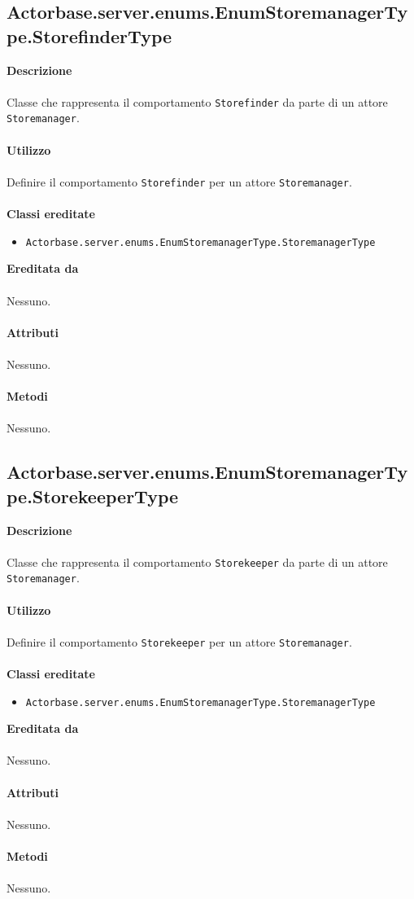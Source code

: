 \documentclass[a4paper]{article}
\begin{document}
			\subsection{Actorbase.server.enums.EnumStoremanagerType.StorefinderType}
		\textbf{Descrizione}
			\\ \\
			Classe che rappresenta il comportamento \texttt{Storefinder} da parte di un attore \texttt{Storemanager}.
			\\ \\
		\textbf{Utilizzo}
			\\ \\
			Definire il comportamento \texttt{Storefinder} per un attore \texttt{Storemanager}.
			\\ \\
		\textbf{Classi ereditate}
			\begin{itemize}
				\item \texttt{Actorbase.server.enums.EnumStoremanagerType.StoremanagerType}
			\end{itemize}
		\textbf{Ereditata da}
		\\ \\
		Nessuno.
		\\ \\
		\textbf{Attributi}
		\\ \\
			Nessuno.
		\\ \\
		\textbf{Metodi}
			\\ \\
			Nessuno.
			
			\subsection{Actorbase.server.enums.EnumStoremanagerType.StorekeeperType}
		\textbf{Descrizione}
			\\ \\
			Classe che rappresenta il comportamento \texttt{Storekeeper} da parte di un attore \texttt{Storemanager}.
			\\ \\
		\textbf{Utilizzo}
			\\ \\
			Definire il comportamento \texttt{Storekeeper} per un attore \texttt{Storemanager}.
			\\ \\
		\textbf{Classi ereditate}
			\begin{itemize}
				\item \texttt{Actorbase.server.enums.EnumStoremanagerType.StoremanagerType}
			\end{itemize}
		\textbf{Ereditata da}
		\\ \\
		Nessuno.
		\\ \\
		\textbf{Attributi}
		\\ \\
			Nessuno.
		\\ \\
		\textbf{Metodi}
			\\ \\
			Nessuno.
			
\end{document}
